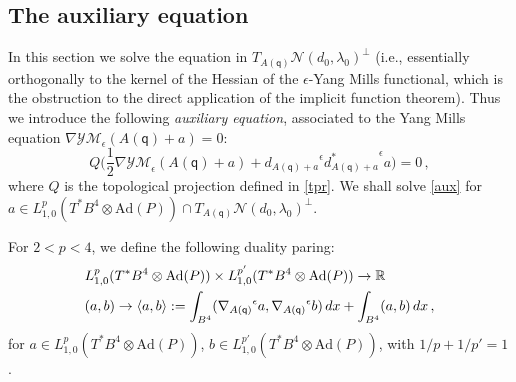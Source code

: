 \documentclass[11pt]{article}
\numberwithin{equation}{section} \setlength{\topmargin}{-35pt}
\newcommand{\R}{\mathbb{R}}
\newcommand{\Ad}{\text{Ad}}
\newcommand{\YMe}{\mathcal{YM}_{\epsilon}}
\newcommand{\q}{\mathsf{q}}
\begin{document}
\subsection{The auxiliary equation}
In this section we solve the equation in
$T_{A(\q)}\mathcal{N}(d_0,\lambda_0)^{\perp}$ (i.e., essentially
orthogonally to the kernel of the Hessian of the $\epsilon$-Yang
Mills functional, which is the obstruction to the direct application
of the implicit function theorem). Thus we introduce the following
\textit{auxiliary equation}, associated to the Yang Mills equation
$\nabla\YMe(A(\q)+a)=0$:
\begin{equation}
\label{aux}
Q\Big(\frac{1}{2}\nabla\YMe(A(\q)+a)+{d_{A(\q)+a}}^{\epsilon}{d_{A(\q)+a}^{\ast}}^{\epsilon}a\Big)=0\,,
\end{equation}
where $Q$ is the topological projection defined in \eqref{tpr}. We
shall solve \eqref{aux} for $a\in
L^p_{1,0}(T^{\ast}B^4\otimes\Ad(P))\cap
T_{A(\q)}\mathcal{N}(d_0,\lambda_0)^{\perp}$.

 For $2<p<4$, we define the following duality paring:
 \begin{align}
 &L^p_{1,0}(T^{\ast}B^4\otimes\Ad(P))\times L^{p'}_{1,0}(T^{\ast}B^4\otimes\Ad(P))\to \R\notag\\
 &(a,b)\to \langle a,b\rangle :=\int_{B^4}({\nabla_{A(\q)}}^{\epsilon}a,{\nabla_{A(\q)}}^{\epsilon}b)\,dx+\int_{B^4}(a,b)\,dx\,,\notag
 \end{align}
 for $a\in L^p_{1,0}(T^{\ast}B^4\otimes\Ad(P))$, $b\in L^{p'}_{1,0}(T^{\ast}B^4\otimes\Ad(P))$, with $1/p+1/p'=1$.
\end{document}
